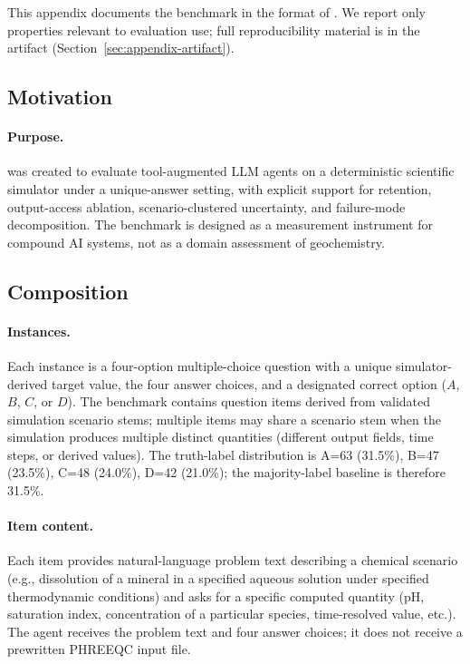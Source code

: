 \documentclass{article}
\begin{document}
This appendix documents the benchmark in the format of \citep{gebru2021datasheets}. We report only properties relevant to evaluation use; full reproducibility material is in the artifact (Section~\ref{sec:appendix-artifact}).

\subsection{Motivation}

\paragraph{Purpose.}
\BenchName{} was created to evaluate tool-augmented LLM agents on a deterministic scientific simulator under a unique-answer setting, with explicit support for retention, output-access ablation, scenario-clustered uncertainty, and failure-mode decomposition. The benchmark is designed as a measurement instrument for compound AI systems, not as a domain assessment of geochemistry.

\subsection{Composition}

\paragraph{Instances.}
Each instance is a four-option multiple-choice question with a unique simulator-derived target value, the four answer choices, and a designated correct option ($A$, $B$, $C$, or $D$). The benchmark contains \BenchN{} question items derived from \BenchScenarioN{} validated simulation scenario stems; multiple items may share a scenario stem when the simulation produces multiple distinct quantities (different output fields, time steps, or derived values). The truth-label distribution is A=63 (31.5\%), B=47 (23.5\%), C=48 (24.0\%), D=42 (21.0\%); the majority-label baseline is therefore 31.5\%.

\paragraph{Item content.}
Each item provides natural-language problem text describing a chemical scenario (e.g., dissolution of a mineral in a specified aqueous solution under specified thermodynamic conditions) and asks for a specific computed quantity (pH, saturation index, concentration of a particular species, time-resolved value, etc.). The agent receives the problem text and four answer choices; it does not receive a prewritten PHREEQC input file.
\end{document}
